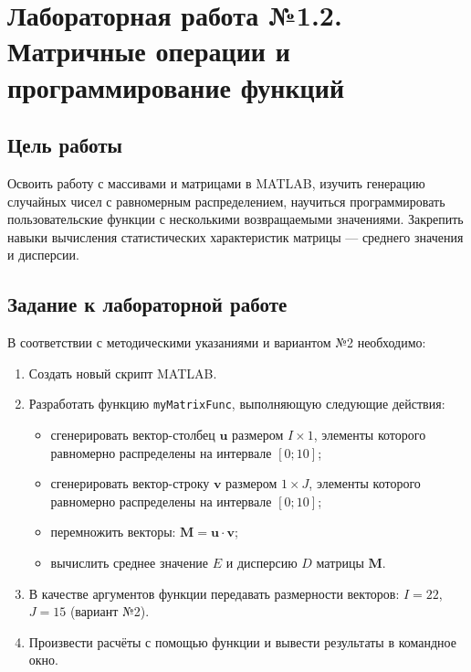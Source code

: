 \chapter{Лабораторная работа №1.2. Матричные операции и программирование функций}
\label{ch:chap2}

\section{Цель работы}
\label{sec:goal2}

    Освоить работу с массивами и матрицами в MATLAB, изучить генерацию случайных чисел с равномерным распределением, научиться программировать пользовательские функции с несколькими возвращаемыми значениями. Закрепить навыки вычисления статистических характеристик матрицы — среднего значения и дисперсии.

\section{Задание к лабораторной работе}
\label{sec:task2}

    В соответствии с методическими указаниями \cite{andreev2024tmo} и вариантом №2 необходимо:

    \begin{enumerate}
        \item Создать новый скрипт MATLAB.
        \item Разработать функцию \verb|myMatrixFunc|, выполняющую следующие действия:
        \begin{itemize}
            \item сгенерировать вектор-столбец $\mathbf{u}$ размером $I \times 1$, элементы которого равномерно распределены на интервале $[0; 10]$;
            \item сгенерировать вектор-строку $\mathbf{v}$ размером $1 \times J$, элементы которого равномерно распределены на интервале $[0; 10]$;
            \item перемножить векторы: $\mathbf{M} = \mathbf{u} \cdot \mathbf{v}$;
            \item вычислить среднее значение $E$ и дисперсию $D$ матрицы $\mathbf{M}$.
        \end{itemize}
        \item В качестве аргументов функции передавать размерности векторов: $I = 22$, $J = 15$ (вариант №2).
        \item Произвести расчёты с помощью функции и вывести результаты в командное окно.
    \end{enumerate}

